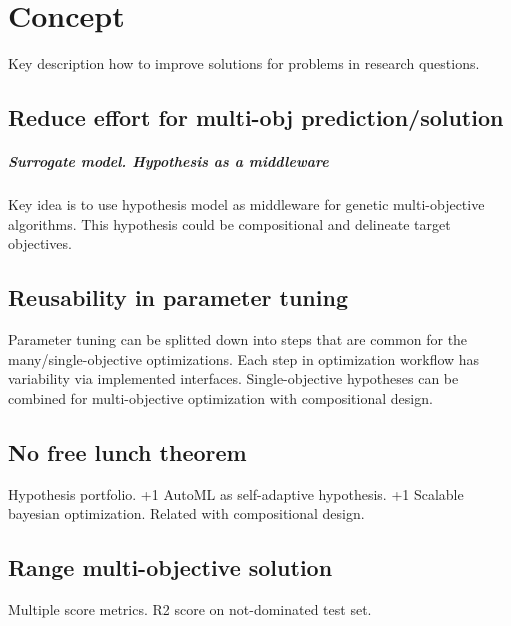 \chapter{Concept}
Key description how to improve solutions for problems in research questions.

    \section{Reduce effort for multi-obj prediction/solution}
        \paragraph{Surrogate model. Hypothesis as a middleware}
        Key idea is to use hypothesis model as middleware for genetic multi-objective algorithms.
        This hypothesis could be compositional and delineate target objectives. 



    \section{Reusability in parameter tuning}
        Parameter tuning can be splitted down into steps that are common for the many/single-objective optimizations. 
        Each step in optimization workflow has variability via implemented interfaces.
        Single-objective hypotheses can be combined for multi-objective optimization with compositional design.

    \section{No free lunch theorem}
        Hypothesis portfolio. +1 AutoML as self-adaptive hypothesis. +1 Scalable bayesian optimization. Related with compositional design.

    \section{Range multi-objective solution}
        Multiple score metrics. R2 score on not-dominated test set.

